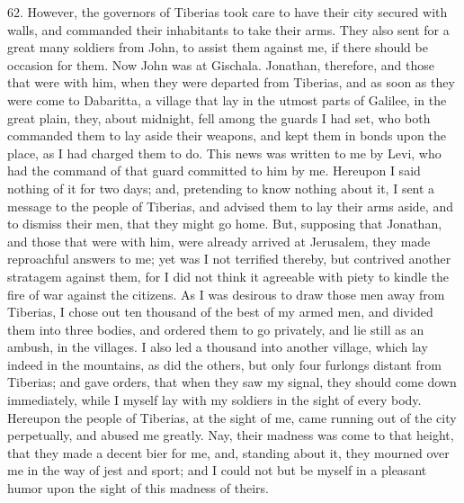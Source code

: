 62. However, the governors of Tiberias took care to have their city
secured with walls, and commanded their inhabitants to take their arms.
They also sent for a great many soldiers from John, to assist them against
me, if there should be occasion for them. Now John was at Gischala.
Jonathan, therefore, and those that were with him, when they were departed
from Tiberias, and as soon as they were come to Dabaritta, a village that
lay in the utmost parts of Galilee, in the great plain, they, about
midnight, fell among the guards I had set, who both commanded them to lay
aside their weapons, and kept them in bonds upon the place, as I had
charged them to do. This news was written to me by Levi, who had the
command of that guard committed to him by me. Hereupon I said nothing of
it for two days; and, pretending to know nothing about it, I sent a
message to the people of Tiberias, and advised them to lay their arms
aside, and to dismiss their men, that they might go home. But, supposing
that Jonathan, and those that were with him, were already arrived at
Jerusalem, they made reproachful answers to me; yet was I not terrified
thereby, but contrived another stratagem against them, for I did not think
it agreeable with piety to kindle the fire of war against the citizens. As
I was desirous to draw those men away from Tiberias, I chose out ten
thousand of the best of my armed men, and divided them into three bodies,
and ordered them to go privately, and lie still as an ambush, in the
villages. I also led a thousand into another village, which lay indeed in
the mountains, as did the others, but only four furlongs distant from
Tiberias; and gave orders, that when they saw my signal, they should come
down immediately, while I myself lay with my soldiers in the sight of
every body. Hereupon the people of Tiberias, at the sight of me, came
running out of the city perpetually, and abused me greatly. Nay, their
madness was come to that height, that they made a decent bier for me, and,
standing about it, they mourned over me in the way of jest and sport; and
I could not but be myself in a pleasant humor upon the sight of this
madness of theirs.

